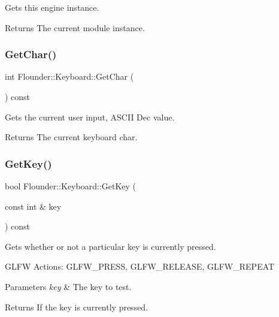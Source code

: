 Gets this engine instance. 

\begin{DoxyReturn}{Returns}
The current module instance. 
\end{DoxyReturn}
\mbox{\label{class_flounder_1_1_keyboard_abe036a0e25d4df1af8cf642b7992128c}} 
\subsubsection{\texorpdfstring{Get\+Char()}{GetChar()}}
{\footnotesize\ttfamily int Flounder\+::\+Keyboard\+::\+Get\+Char (\begin{DoxyParamCaption}{ }\end{DoxyParamCaption}) const}



Gets the current user input, A\+S\+C\+II Dec value. 

\begin{DoxyReturn}{Returns}
The current keyboard char. 
\end{DoxyReturn}
\mbox{\label{class_flounder_1_1_keyboard_a96078e0aa8d147df2e0d9fdf2b74a667}} 
\subsubsection{\texorpdfstring{Get\+Key()}{GetKey()}}
{\footnotesize\ttfamily bool Flounder\+::\+Keyboard\+::\+Get\+Key (\begin{DoxyParamCaption}\item[{const int \&}]{key }\end{DoxyParamCaption}) const}



Gets whether or not a particular key is currently pressed. 

G\+L\+FW Actions\+: G\+L\+F\+W\+\_\+\+P\+R\+E\+SS, G\+L\+F\+W\+\_\+\+R\+E\+L\+E\+A\+SE, G\+L\+F\+W\+\_\+\+R\+E\+P\+E\+AT


\begin{DoxyParams}{Parameters}
{\em key} & The key to test. \\
\hline
\end{DoxyParams}
\begin{DoxyReturn}{Returns}
If the key is currently pressed. 
\end{DoxyReturn}
\mbox{\label{class_flounder_1_1_keyboard_afd33527c78a5ab2d75e9d9e2e1bc525e}} 
